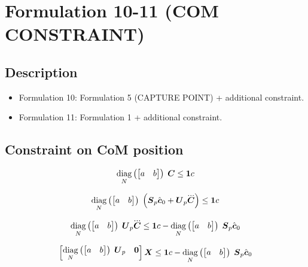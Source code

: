 \section{Formulation 10-11 (COM CONSTRAINT)}


\subsection{Description}
\begin{itemize}
    \item Formulation 10: Formulation 5 (CAPTURE POINT) + additional constraint.
    \item Formulation 11: Formulation 1 + additional constraint.
\end{itemize}



\subsection{Constraint on CoM position}

\begin{equation*}
    \underset{N}{\operatorname{diag}}\left(\begin{bmatrix} a & b \end{bmatrix}\right)\; \mbox{\boldmath $C$}  \le  \mbox{\boldmath $1$} c
\end{equation*}

\begin{equation*}
    \diag{N}{\begin{bmatrix} a & b \end{bmatrix}}
    \left(
        \M{S}_{p} \cstate_0 + \M{U}_{p} \cJerk
    \right)
    \le
    \M{1} c
\end{equation*}


\begin{equation*}
    \diag{N}{\begin{bmatrix} a & b \end{bmatrix}}
    \M{U}_{p} \cJerk
    \le
    \M{1} c 
    -
    \diag{N}{\begin{bmatrix} a & b \end{bmatrix}} \M{S}_{p} \cstate_0
\end{equation*}


\begin{equation*}
    \begin{bmatrix}
        \underset{N}{\operatorname{diag}}\left(\begin{bmatrix} a & b \end{bmatrix}\right)\; \mbox{\boldmath $U$}_{p}     &   \mbox{\boldmath $0$} 
    \end{bmatrix}
    \mbox{\boldmath $X$}
    \le
    \mbox{\boldmath $1$} c 
    -
    \underset{N}{\operatorname{diag}}\left(\begin{bmatrix} a & b \end{bmatrix}\right)\; \mbox{\boldmath $S$}_{p} \hat{\mbox{\boldmath $c$}}_0
\end{equation*}
